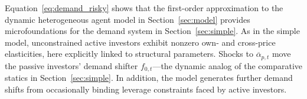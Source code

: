 Equation~\eqref{eq:demand_risky} shows that the first-order approximation to the dynamic heterogeneous agent model in Section~\ref{sec:model} provides microfoundations for the demand system in Section~\ref{sec:simple}. As in the simple model, unconstrained active investors exhibit nonzero own- and cross-price elasticities, here explicitly linked to structural parameters. Shocks to $\overline{\alpha}_{p,t}$ move the passive investors’ demand shifter $f_{0,t}$—the dynamic analog of the comparative statics in Section~\ref{sec:simple}. In addition, the model generates further demand shifts from occasionally binding leverage constraints faced by active investors.




